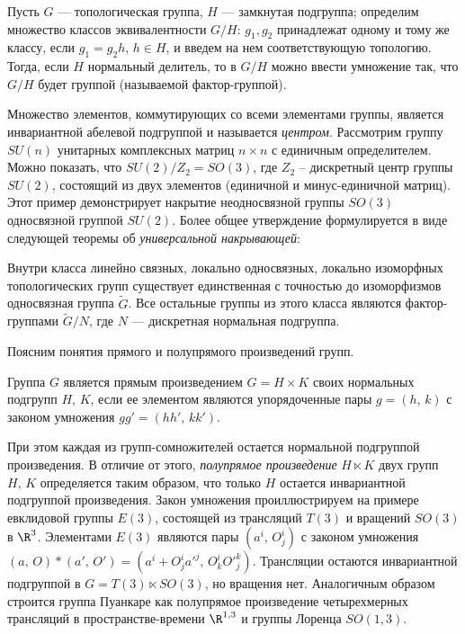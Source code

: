 \documentclass[a4paper
]{article}
\begin{document}
\begin{Trm}
Пусть $G$ --- топологическая группа, $H$ --- замкнутая подгруппа;
определим множество классов эквивалентности $G/H$: $g_1, g_2$
принадлежат одному и тому же классу, если $g_1=g_2 h,\, h\in H$, и
введем на нем соответствующую топологию. Тогда, если $H$
нормальный делитель, то в $G/H$ можно ввести умножение так, что
$G/H$  будет группой (называемой фактор-группой).
\end{Trm}
Множество элементов, коммутирующих со всеми элементами группы,
является инвариантной абелевой подгруппой и называется {\em
центром}. Рассмотрим группу $SU(n)$ унитарных комплексных матриц
$n\times n$ с единичным определителем. Можно показать, что
$SU(2)/Z_2=SO(3)$, где $Z_2$ -- дискретный центр группы $SU(2)$,
состоящий из двух элементов (единичной и минус-единичной матриц).
Этот пример  демонстрирует накрытие неодносвязной группы $SO(3)$
односвязной группой $SU(2)$. Более общее утверждение формулируется
в виде следующей теоремы об {\em универсальной накрывающей}:
\begin{Trm}
Внутри класса линейно связных, локально односвязных, локально
изоморфных  топологических групп существует единственная с
точностью до изоморфизмов односвязная группа $\tilde G$. Все
остальные группы из этого класса являются фактор-группами $\tilde
G/N$, где $N$ --- дискретная нормальная подгруппа.
\end{Trm}
Поясним понятия прямого и полупрямого произведений групп.
\begin{Def} Группа $G$  является   прямым произведением  $G=H \times
K$ своих нормальных подгрупп $H,\,K$, если ее элементом являются
упорядоченные пары $g=(h,\,k)$  с законом умножения
$gg'=(hh',\,kk')$. \end{Def} \noindent При этом каждая из
групп-сомножителей остается нормальной подгруппой произведения.  В
отличие от этого, {\em полупрямое произведение}  $H\ltimes K$ двух
групп $H,\,K$ определяется таким образом, что только $H$ остается
инвариантной подгруппой произведения. Закон умножения
проиллюстрируем на примере евклидовой группы $E(3)$, состоящей из
трансляций $T(3)$ и вращений $SO(3)$ в $\R^3$. Элементами $E(3)$
являются пары $(a^i,\,O^i_j)$ с законом умножения $( a,\,O)* (
a',\,O')= (a^i+O^i_j a'^j,\,O^i_k O'^k_j)$. Трансляции остаются
инвариантной подгруппой в $G=T(3)\ltimes SO(3)$, но вращения нет.
Аналогичным образом строится группа Пуанкаре как полупрямое
произведение четырехмерных трансляций в пространстве-времени
$\R^{1,3}$ и группы Лоренца $SO(1,3)$.
\par
\end{document}
